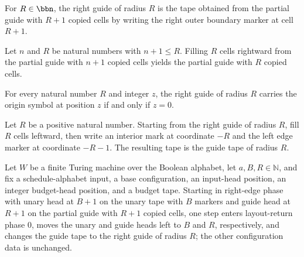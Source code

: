 \begin{definition}
\label{Complexity.rightGuide}
\leanok
{}
For $R \in \bbn$, the right guide of radius $R$ is the tape obtained from the partial
guide with $R+1$ copied cells by writing the right outer boundary marker at cell $R+1$.
\end{definition}

\begin{lemma}
\label{Complexity.guideFill_right_copy}
\leanok
{}
Let $n$ and $R$ be natural numbers with $n+1\le R$. Filling $R$ cells rightward from the
partial guide with $n+1$ copied cells yields the partial guide with $R$ copied cells.
\end{lemma}

\begin{lemma}
\label{Complexity.rightGuide_origin}
\leanok
{}
For every natural number $R$ and integer $z$, the right guide of radius $R$ carries the
origin symbol at position $z$ if and only if $z=0$.
\end{lemma}

\begin{lemma}
\label{Complexity.guideFill_left_finish}
\leanok
{}
Let $R$ be a positive natural number. Starting from the right guide of radius $R$, fill
$R$ cells leftward, then write an interior mark at coordinate $-R$ and the left edge
marker at coordinate $-R-1$. The resulting tape is the guide tape of radius $R$.
\end{lemma}

\begin{lemma}
\label{Complexity.setupCfg_right_edge}
\leanok
{}
Let $W$ be a finite Turing machine over the Boolean alphabet, let $a,B,R\in\mathbb{N}$,
and fix a schedule-alphabet input, a base configuration, an input-head position, an
integer budget-head position, and a budget tape. Starting in right-edge phase with unary
head at $B+1$ on the unary tape with $B$ markers and guide head at $R+1$ on the partial
guide with $R+1$ copied cells, one step enters layout-return phase $0$, moves the unary
and guide heads left to $B$ and $R$, respectively, and changes the guide tape to the
right guide of radius $R$; the other configuration data is unchanged.
\end{lemma}

